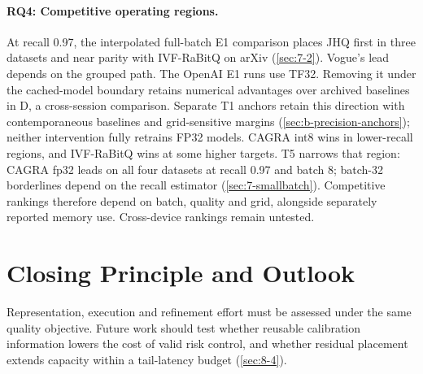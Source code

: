 \paragraph{RQ4: Competitive operating regions.}
At recall 0.97, the interpolated full-batch E1 comparison places JHQ first
in three datasets and near parity with IVF-RaBitQ on arXiv
(\cref{sec:7-2}). Vogue's lead depends on the grouped path. The OpenAI E1 runs use TF32. Removing it under the cached-model boundary
retains numerical advantages over archived baselines in D, a cross-session
comparison. Separate T1 anchors retain this direction with contemporaneous
baselines and grid-sensitive margins (\cref{sec:b-precision-anchors});
neither intervention fully retrains FP32 models. CAGRA int8
wins in lower-recall regions, and IVF-RaBitQ wins at some higher targets.
T5 narrows that region: CAGRA fp32 leads on all four datasets at recall
0.97 and batch 8; batch-32 borderlines depend on the recall estimator
(\cref{sec:7-smallbatch}). Competitive rankings therefore depend on batch,
quality and grid, alongside separately reported memory use. Cross-device
rankings remain untested.

\section{Closing Principle and Outlook}
\label{sec:9-2}
Representation, execution and refinement effort must be assessed under
the same quality objective. Future work should test whether reusable
calibration information lowers the cost of valid risk control, and whether
residual placement extends capacity within a tail-latency budget
(\cref{sec:8-4}).
